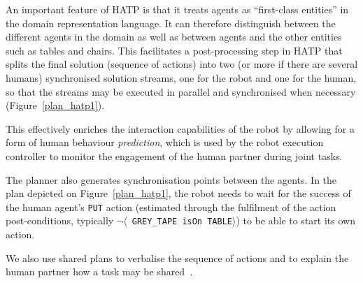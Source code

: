 \documentclass[preprint,3p,times]{elsarticle}
\newcommand{\stmt}[1]{{\footnotesize \tt $\langle$ #1\relax$\rangle$}}
\begin{document}
An important feature of HATP is that it treats agents as ``first-class
entities'' in the domain representation language. It can therefore
distinguish between the different agents in the domain as well as
between agents and the other entities such as tables and chairs. This
facilitates a post-processing step in HATP that splits the final
solution (sequence of actions) into two (or more if there are several
humans) synchronised solution
streams, one for the robot and one for the human, so that the streams may be executed in
parallel and synchronised when necessary (Figure~\ref{plan_hatp1}).

This effectively enriches the interaction capabilities
of the robot by allowing for a form of human behaviour \emph{prediction}, which
is used by the robot execution controller to monitor the engagement of the human
partner during joint tasks.

The planner also generates synchronisation points between the agents.  In the
plan depicted on Figure~\ref{plan_hatp1}, the robot needs to wait for the
success of the human agent's {\tt PUT} action (estimated through the fulfilment
of the action post-conditions, typically $\neg$\stmt{GREY\_TAPE isOn TABLE}) to
be able to start its own action.

We also use shared plans to verbalise the sequence of actions and to explain
the human partner how a task may be shared~\cite{warnier2012when}.
\end{document}
